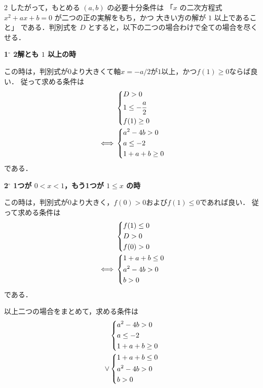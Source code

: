 \documentclass[../../main.tex]{subfiles}
\begin{document}
\begin{multicols}{2}
  したがって，もとめる $(a, b)$ の必要十分条件は
  「$x$ の二次方程式 $x^2+ax+b=0$ が二つの正の実解をもち，かつ
  大きい方の解が $1$ 以上であること」
  である．判別式を $D$ とすると，以下の二つの場合わけで全ての場合を尽くせる．

  \textbf{1$^\circ$ 2解とも $1$ 以上の時}

  この時は，判別式が$0$より大きくて軸$x=-a/2$が$1$以上，かつ$f(1)\ge 0$ならば良い．
  従って求める条件は
  \begin{align}
    &
    \begin{dcases}
      D > 0               \\
      1 \leq -\dfrac{a}{2} \\
      f(1) \geq 0
    \end{dcases} \\
    \iff
    &
    \begin{dcases}
      a^2-4b > 0 \\
      a \leq -2  \\
      1+a+b \geq 0
    \end{dcases}
  \end{align}
  である．

  \textbf{2$^\circ$ 1つが $0 < x < 1$，もう1つが $1 \leq x$ の時}

  この時は，判別式が$0$より大きく，$f(0)>0$および$f(1)\le 0$であれば良い．
  従って求める条件は
  \begin{align}
    &
    \begin{dcases}
      f(1) \leq 0 \\
      D > 0       \\
      f(0) > 0
    \end{dcases} \\
    \iff
    &
    \begin{dcases}
      1+a+b \leq 0 \\
      a^2-4b > 0   \\
      b > 0
    \end{dcases}
  \end{align}
  である．

  以上二つの場合をまとめて，求める条件は
  \begin{align}
    &
    \begin{dcases}
      a^2-4b > 0 \\
      a \leq -2  \\
      1+a+b \geq 0
    \end{dcases} \\
    \lor
    &
    \begin{dcases}
      1+a+b \leq 0 \\
      a^2-4b > 0   \\
      b > 0
    \end{dcases}
  \end{align}


\end{multicols}
\end{document}
